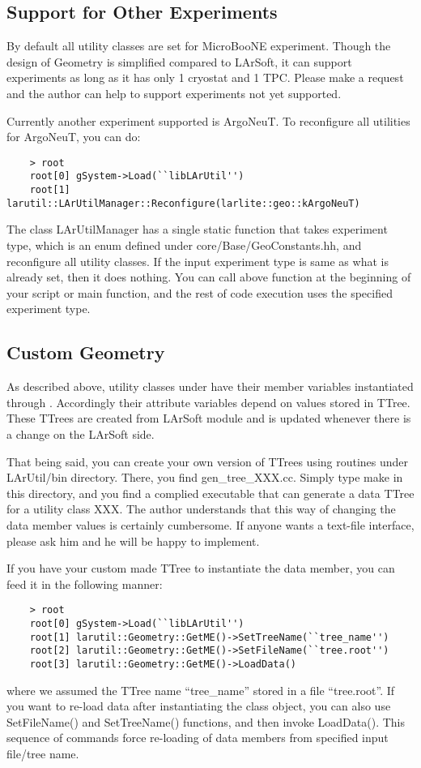 \subsection{Support for Other Experiments}
By default all utility classes are set for MicroBooNE experiment. Though the design of {\ttfamily Geometry} is simplified compared to LArSoft, it can support experiments as long as it has only 1 cryostat and 1 TPC. Please make a request and the author can help to support experiments not yet supported. 

Currently another experiment supported is ArgoNeuT. To reconfigure all utilities for ArgoNeuT, you can do:
\begin{lstlisting}
    > root
    root[0] gSystem->Load(``libLArUtil'')
    root[1] larutil::LArUtilManager::Reconfigure(larlite::geo::kArgoNeuT)
\end{lstlisting}
The class {\ttfamily LArUtilManager} has a single static function that takes experiment type, which is an {\ttfamily enum} defined under {\ttfamily core/Base/GeoConstants.hh}, and reconfigure all utility classes. If the input experiment type is same as what is already set, then it does nothing. You can call above function at the beginning of your script or {\ttfamily main} function, and the rest of code execution uses the specified experiment type.

\subsection{Custom Geometry}
As described above, utility classes under \LArUtil have their member variables instantiated through . Accordingly their attribute variables depend on values stored in {\ttfamily TTree}. These {\ttfamily TTree}s are created from LArSoft module and is updated whenever there is a change on the LArSoft side. 

That being said, you can create your own version of TTrees using routines under {\ttfamily LArUtil/bin} directory. There, you find {\ttfamily gen\_tree\_XXX.cc}. Simply type {\ttfamily make} in this directory, and you find a complied executable that can generate a data {\ttfamily TTree} for a utility class {\ttfamily XXX}. The author understands that this way of changing the data member values is certainly cumbersome. If anyone wants a text-file interface, please ask him and he will be happy to implement.

If you have your custom made {\ttfamily TTree} to instantiate the data member, you can feed it in the following manner:
\begin{lstlisting}
    > root
    root[0] gSystem->Load(``libLArUtil'')
    root[1] larutil::Geometry::GetME()->SetTreeName(``tree_name'')
    root[2] larutil::Geometry::GetME()->SetFileName(``tree.root'')
    root[3] larutil::Geometry::GetME()->LoadData()
\end{lstlisting}
where we assumed the {\ttfamily TTree} name ``tree\_name'' stored in a \ROOT file ``tree.root''. If you want to re-load data after instantiating the class object, you can also use {\ttfamily SetFileName()} and {\ttfamily SetTreeName()} functions, and then invoke {\ttfamily LoadData()}. This sequence of commands force re-loading of data members from specified input file/tree name.
